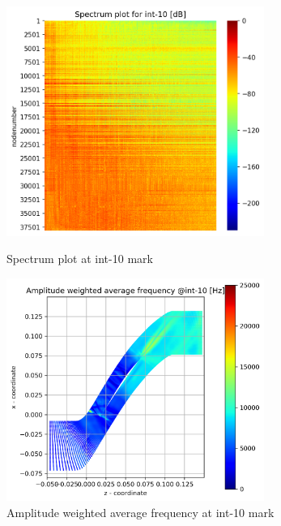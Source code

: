 \begin{figure}[ht]
  \centering
  \includegraphics[width=0.75\textwidth]{Figures/int-10_spectrum.png}
  \caption{Spectrum plot at int-10 mark} \label{int-10-spectrum}
  
  \vspace*{\floatsep}%

  \includegraphics[width=0.75\textwidth]{Figures/int-10-awaf.png}
  \caption{Amplitude weighted average frequency at int-10 mark} \label{int-10-awaf}
\end{figure}
